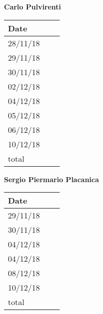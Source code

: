 \documentclass[../main.tex]{subfiles}
\begin{document}
\begin{center}
	{\bf Carlo Pulvirenti}
	\vspace{2mm}

		\begin{tabular}{p{1.3cm}|p{1.8cm}|p{6.7cm}}
			\hline
			\bf Date & \bf \makebox[1.8cm][c]{Hours} & \bf \makebox[6.7cm][c]{Description} \\
			\hline
			28/11/18 & \makebox[1.8cm][c]{1h} & \makebox[6.7cm][c]{Architectural Design}\\
			29/11/18 & \makebox[1.8cm][c]{3h} & \makebox[6.7cm][c]{Runtime View}\\
			30/11/18 & \makebox[1.8cm][c]{2h} & \makebox[6.7cm][c]{Runtime View}\\
			02/12/18 & \makebox[1.8cm][c]{4h} & \makebox[6.7cm][c]{Runtime View}\\
			04/12/18 & \makebox[1.8cm][c]{2h} & \makebox[6.7cm][c]{Reviewing}\\
			05/12/18 & \makebox[1.8cm][c]{3h} & \makebox[6.7cm][c]{Deployment View}\\
			06/12/18 & \makebox[1.8cm][c]{4h} & \makebox[6.7cm][c]{Component Interfaces}\\
			10/12/18 & \makebox[1.8cm][c]{3h} & \makebox[6.7cm][c]{Reviewing}\\ 
			total    & \makebox[1.8cm][c]{22h}
		\end{tabular}
\end{center}

\vspace{1cm}

\newpage

\begin{center}
	{\bf Sergio Piermario Placanica}
	\vspace{2mm}

		\begin{tabular}{p{1.3cm}|p{1.8cm}|p{6.7cm}}
			\hline
			\bf Date & \bf \makebox[1.8cm][c]{Hours} & \bf \makebox[6.7cm][c]{Description} \\
			\hline
			29/11/18 & \makebox[1.8cm][c]{2h} & \makebox[6.7cm][c]{Architechtural Design}\\
			30/11/18 & \makebox[1.8cm][c]{1h} & \makebox[6.7cm][c]{Architectural Design}\\
			04/12/18 & \makebox[1.8cm][c]{2h} & \makebox[6.7cm][c]{Reviewing}\\
			04/12/18 & \makebox[1.8cm][c]{3h} & \makebox[6.7cm][c]{Implementation and Testing}\\
			08/12/18 & \makebox[1.8cm][c]{3h} & \makebox[6.7cm][c]{UX diagram}\\
			10/12/18 & \makebox[1.8cm][c]{3h} & \makebox[6.7cm][c]{Reviewing}\\
			total    & \makebox[1.8cm][c]{14h}
		\end{tabular}
	\end{center}
\end{document}
